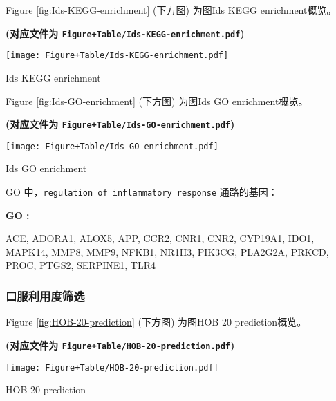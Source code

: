 \documentclass[
]{article}
\begin{document}
Figure \ref{fig:Ids-KEGG-enrichment} (下方图) 为图Ids KEGG enrichment概览。

\textbf{(对应文件为 \texttt{Figure+Table/Ids-KEGG-enrichment.pdf})}

\def\@captype{figure}
\begin{center}
\texttt{[image: Figure+Table/Ids-KEGG-enrichment.pdf]}
\caption{Ids KEGG enrichment}\label{fig:Ids-KEGG-enrichment}
\end{center}

Figure \ref{fig:Ids-GO-enrichment} (下方图) 为图Ids GO enrichment概览。

\textbf{(对应文件为 \texttt{Figure+Table/Ids-GO-enrichment.pdf})}

\def\@captype{figure}
\begin{center}
\texttt{[image: Figure+Table/Ids-GO-enrichment.pdf]}
\caption{Ids GO enrichment}\label{fig:Ids-GO-enrichment}
\end{center}

GO 中，\texttt{regulation\ of\ inflammatory\ response} 通路的基因：

\begin{center}\begin{tcolorbox}[colback=gray!10, colframe=gray!50, width=0.9\linewidth, arc=1mm, boxrule=0.5pt]
\textbf{
GO
:}

\vspace{0.5em}

    ACE, ADORA1, ALOX5, APP, CCR2, CNR1, CNR2, CYP19A1,
IDO1, MAPK14, MMP8, MMP9, NFKB1, NR1H3, PIK3CG, PLA2G2A,
PRKCD, PROC, PTGS2, SERPINE1, TLR4

\vspace{2em}
\end{tcolorbox}
\end{center}

\hypertarget{ux53e3ux670dux5229ux7528ux5ea6ux7b5bux9009}{%
\subsubsection{口服利用度筛选}\label{ux53e3ux670dux5229ux7528ux5ea6ux7b5bux9009}}

Figure \ref{fig:HOB-20-prediction} (下方图) 为图HOB 20 prediction概览。

\textbf{(对应文件为 \texttt{Figure+Table/HOB-20-prediction.pdf})}

\def\@captype{figure}
\begin{center}
\texttt{[image: Figure+Table/HOB-20-prediction.pdf]}
\caption{HOB 20 prediction}\label{fig:HOB-20-prediction}
\end{center}
\end{document}
